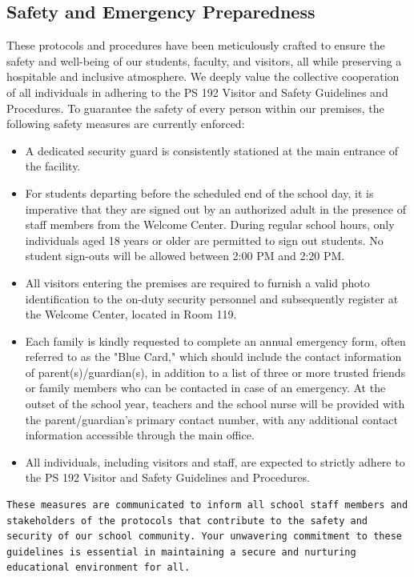 \documentclass[11pt, letterpaper]{article}
\begin{document}
\subsection{Safety and Emergency Preparedness}
These protocols and procedures have been meticulously crafted to ensure the safety and well-being of our students, faculty, and visitors, all while preserving a hospitable and inclusive atmosphere. We deeply value the collective cooperation of all individuals in adhering to the PS 192 Visitor and Safety Guidelines and Procedures. To guarantee the safety of every person within our premises, the following safety measures are currently enforced:
\begin{itemize}
\item A dedicated security guard is consistently stationed at the main entrance of the facility.
\item For students departing before the scheduled end of the school day, it is imperative that they are signed out by an authorized adult in the presence of staff members from the Welcome Center. During regular school hours, only individuals aged 18 years or older are permitted to sign out students. No student sign-outs will be allowed between 2:00 PM and 2:20 PM.
\item All visitors entering the premises are required to furnish a valid photo identification to the on-duty security personnel and subsequently register at the Welcome Center, located in Room 119.
\item Each family is kindly requested to complete an annual emergency form, often referred to as the "Blue Card," which should include the contact information of parent(s)/guardian(s), in addition to a list of three or more trusted friends or family members who can be contacted in case of an emergency. At the outset of the school year, teachers and the school nurse will be provided with the parent/guardian's primary contact number, with any additional contact information accessible through the main office.
\item All individuals, including visitors and staff, are expected to strictly adhere to the PS 192 Visitor and Safety Guidelines and Procedures.
\end{itemize}
\begin{Verbatim}[breaklines=true, breakanywhere=true]
These measures are communicated to inform all school staff members and stakeholders of the protocols that contribute to the safety and security of our school community. Your unwavering commitment to these guidelines is essential in maintaining a secure and nurturing educational environment for all.
\end{Verbatim}
\end{document}
